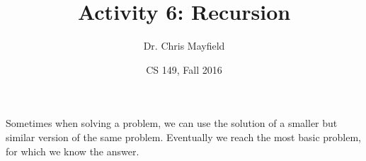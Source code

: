 \documentclass[12pt]{article}
\title{Activity 6: Recursion}
\author{Dr. Chris Mayfield}
\date{CS 149, Fall 2016}
\begin{document}
\maketitle

Sometimes when solving a problem, we can use the solution of a smaller but similar version of the same problem.
Eventually we reach the most basic problem, for which we know the answer.




\end{document}
